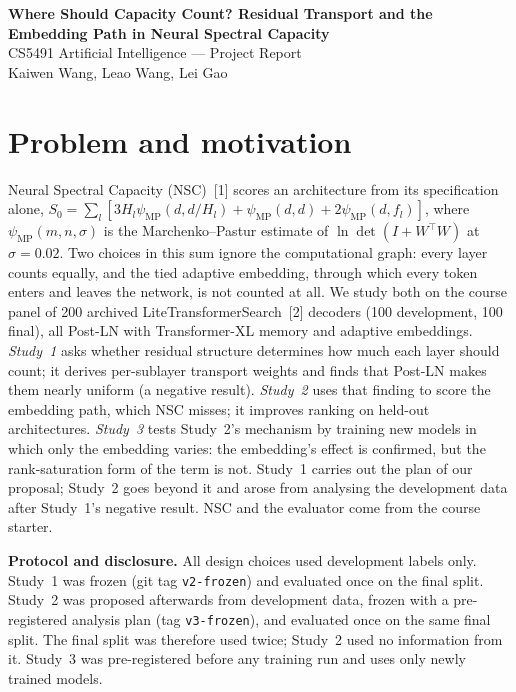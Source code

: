 \documentclass[a4paper,12pt]{article}
\def\TeamMembers{Kaiwen Wang, Leao Wang, Lei Gao}
\def\ContactEmail{}
\newcommand{\psimp}{\psi_{\mathrm{MP}}}
\begin{document}
\begin{center}
\textbf{Where Should Capacity Count? Residual Transport and the Embedding Path in Neural Spectral Capacity}\\
CS5491 Artificial Intelligence --- Project Report\\
\TeamMembers\ifx\ContactEmail\empty\else\\ \ContactEmail\fi
\end{center}

\section{Problem and motivation}
Neural Spectral Capacity (NSC)~[1] scores an architecture from its specification alone, $S_0=\sum_l[3H_l\psimp(d,d/H_l)+\psimp(d,d)+2\psimp(d,f_l)]$, where $\psimp(m,n,\sigma)$ is the Marchenko--Pastur estimate of $\ln\det(I+W^\top W)$ at $\sigma=0.02$. Two choices in this sum ignore the computational graph: every layer counts equally, and the tied adaptive embedding, through which every token enters and leaves the network, is not counted at all. We study both on the course panel of 200 archived LiteTransformerSearch~[2] decoders (100 development, 100 final), all Post-LN with Transformer-XL memory and adaptive embeddings. \emph{Study~1} asks whether residual structure determines how much each layer should count; it derives per-sublayer transport weights and finds that Post-LN makes them nearly uniform (a negative result). \emph{Study~2} uses that finding to score the embedding path, which NSC misses; it improves ranking on held-out architectures. \emph{Study~3} tests Study~2's mechanism by training new models in which only the embedding varies: the embedding's effect is confirmed, but the rank-saturation form of the term is not. Study~1 carries out the plan of our proposal; Study~2 goes beyond it and arose from analysing the development data after Study~1's negative result. NSC and the evaluator come from the course starter.

\textbf{Protocol and disclosure.} All design choices used development labels only. Study~1 was frozen (git tag \texttt{v2-frozen}) and evaluated once on the final split. Study~2 was proposed afterwards from development data, frozen with a pre-registered analysis plan (tag \texttt{v3-frozen}), and evaluated once on the same final split. The final split was therefore used twice; Study~2 used no information from it. Study~3 was pre-registered before any training run and uses only newly trained models.
\end{document}

